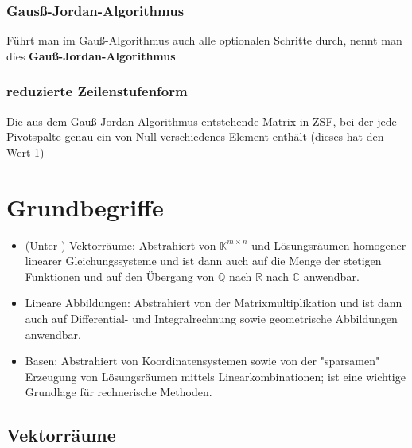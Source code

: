 \documentclass[titlepage]{article}
\newcommand{\K}{\mathbb{K}}
\newcommand{\C}{\mathbb{C}}
\newcommand{\Q}{\mathbb{Q}}
\newcommand{\R}{\mathbb{R}}
\newcommand{\1}{\mathbb{1}}
\newcommand{\0}{\mathbb{0}}
\begin{document}
				\subsubsection{Gausß-Jordan-Algorithmus}
					Führt man im Gauß-Algorithmus auch alle optionalen Schritte durch, nennt man dies \textbf{Gauß-Jordan-Algorithmus}
				\subsubsection{reduzierte Zeilenstufenform}
					Die aus dem Gauß-Jordan-Algorithmus entstehende Matrix in ZSF, bei der jede Pivotspalte genau ein von Null verschiedenes Element enthält (dieses hat den Wert 1)
		\section{Grundbegriffe}
			\begin{itemize}
				\item (Unter-) Vektorräume: Abstrahiert von $\K^{m\times n}$ und Lösungsräumen homogener linearer Gleichungssysteme und ist dann auch auf die Menge der stetigen Funktionen und auf den Übergang von $\Q$ nach $\R$ nach $\C$ anwendbar.
				\item Lineare Abbildungen: Abstrahiert von der Matrixmultiplikation und ist dann auch auf Differential- und Integralrechnung sowie geometrische Abbildungen anwendbar.
				\item Basen: Abstrahiert von Koordinatensystemen sowie von der "sparsamen" Erzeugung von Lösungsräumen mittels Linearkombinationen; ist eine wichtige Grundlage für rechnerische Methoden.
			\end{itemize}
			\subsection{Vektorräume}
\end{document}
